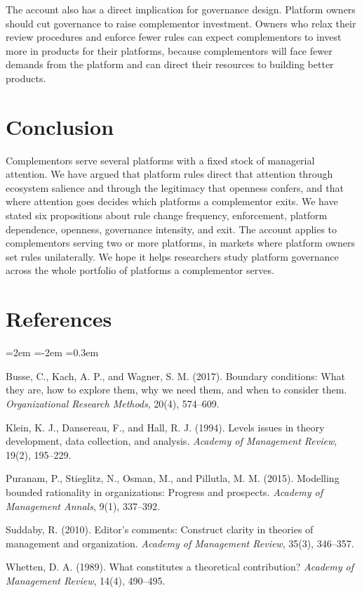 \documentclass[12pt]{article}
\begin{document}
The account also has a direct implication for governance design. Platform owners should cut governance to raise complementor investment. Owners who relax their review procedures and enforce fewer rules can expect complementors to invest more in products for their platforms, because complementors will face fewer demands from the platform and can direct their resources to building better products.

\section{Conclusion}

Complementors serve several platforms with a fixed stock of managerial attention. We have argued that platform rules direct that attention through ecosystem salience and through the legitimacy that openness confers, and that where attention goes decides which platforms a complementor exits. We have stated six propositions about rule change frequency, enforcement, platform dependence, openness, governance intensity, and exit. The account applies to complementors serving two or more platforms, in markets where platform owners set rules unilaterally. We hope it helps researchers study platform governance across the whole portfolio of platforms a complementor serves.

\section*{References}

\begin{list}{}{\leftmargin=2em \itemindent=-2em \itemsep=0.3em}
\item Busse, C., Kach, A. P., and Wagner, S. M. (2017). Boundary conditions: What they are, how to explore them, why we need them, and when to consider them. \textit{Organizational Research Methods}, 20(4), 574--609.
\item Klein, K. J., Dansereau, F., and Hall, R. J. (1994). Levels issues in theory development, data collection, and analysis. \textit{Academy of Management Review}, 19(2), 195--229.
\item Puranam, P., Stieglitz, N., Osman, M., and Pillutla, M. M. (2015). Modelling bounded rationality in organizations: Progress and prospects. \textit{Academy of Management Annals}, 9(1), 337--392.
\item Suddaby, R. (2010). Editor's comments: Construct clarity in theories of management and organization. \textit{Academy of Management Review}, 35(3), 346--357.
\item Whetten, D. A. (1989). What constitutes a theoretical contribution? \textit{Academy of Management Review}, 14(4), 490--495.
\end{list}
\end{document}
